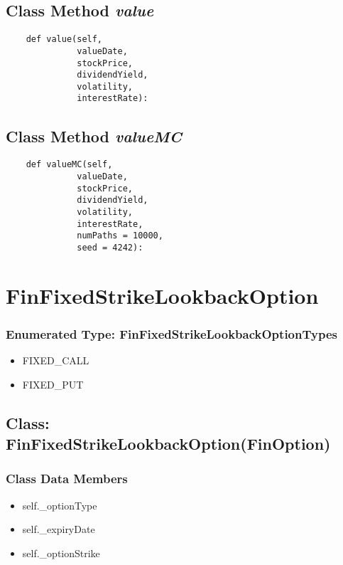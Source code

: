 \documentclass[twoside,11pt]{book}
\begin{document}
\subsection{Class Method {\it value}}


\begin{lstlisting}
    def value(self,
              valueDate,
              stockPrice,
              dividendYield,
              volatility,
              interestRate):
\end{lstlisting}

\subsection{Class Method {\it valueMC}}


\begin{lstlisting}
    def valueMC(self,
              valueDate,
              stockPrice,
              dividendYield,
              volatility,
              interestRate,
              numPaths = 10000,
              seed = 4242):
\end{lstlisting}

\newpage
\section{FinFixedStrikeLookbackOption}

\subsubsection{Enumerated Type: FinFixedStrikeLookbackOptionTypes}
\begin{itemize}
\item{FIXED\_CALL}
\item{FIXED\_PUT}
\end{itemize}

\subsection{Class: FinFixedStrikeLookbackOption(FinOption)}


\subsubsection{Class Data Members}
\begin{itemize}
\item{self.\_optionType}
\item{self.\_expiryDate}
\item{self.\_optionStrike}
\end{itemize}
\end{document}
